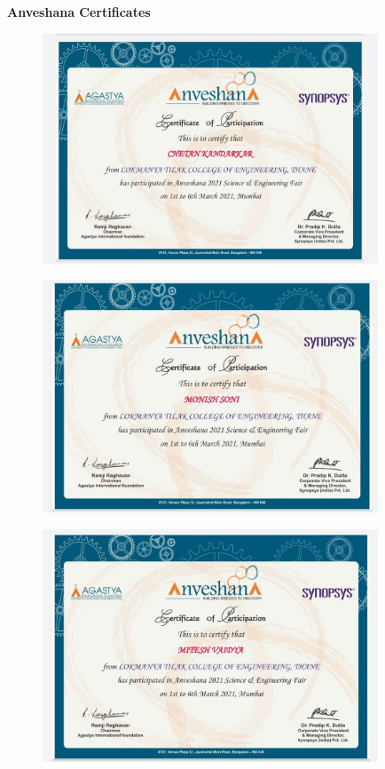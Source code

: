  \vspace{1cm}

\newpage 
   \begin{flushleft}	 
	\hspace{0.5cm} \large \textbf{Anveshana Certificates} 
	\vspace{0.5cm} 
	\end{flushleft} 


   \begin{figure}[h]
		\centering
	\includegraphics[width=100mm,scale=1]{chetan2}
\end{figure}

\vspace{1cm}

\begin{figure}[h]
    \centering
    \includegraphics[width=100mm,scale=1]{monish2}
\end{figure}

\newpage

\vspace{1cm}

   \begin{figure}[h]
		\centering
	\includegraphics[width=100mm,scale=1]{mitesh2}
\end{figure}

